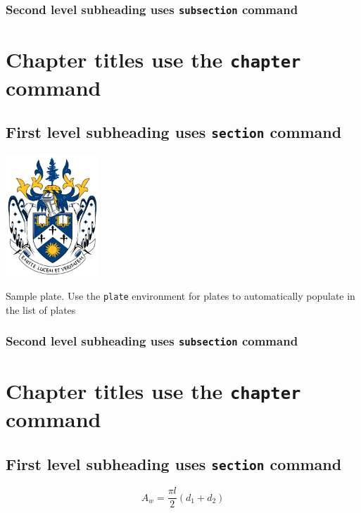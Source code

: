 \documentclass[openany, 12pt]{book}
\begin{document}
\subsection{Second level subheading uses \texttt{subsection} command}

\chapter{Chapter titles use the \texttt{chapter} command}

\section{First level subheading uses \texttt{section} command}

{%
\begin{plate}
    \centering
    \includegraphics[width=3.5cm]{laurentian-university-coa.png}
    \caption{Sample plate. Use the \texttt{plate} environment for plates to automatically populate in the list of plates}
\end{plate}

{%
\subsection{Second level subheading uses \texttt{subsection} command}

\chapter{Chapter titles use the \texttt{chapter} command}

\section{First level subheading uses \texttt{section} command}

\begin{equation}
    A_w = \frac{\pi l}{2}\left(d_1 + d_2\right)
\end{equation}

}}
\end{document}
